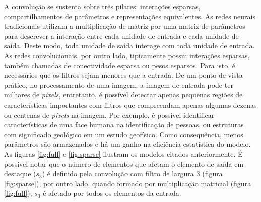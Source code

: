 A convolução se sustenta sobre três pilares: interações esparsas, compartilhamentos
de parâmetros e representações equivalentes. As redes neurais tradicionais
utilizam a multiplicação de matriz por uma matriz de parâmetros para descrever
a interação entre cada unidade de entrada e cada unidade de saída. Deste modo,
toda unidade de saída interage com toda unidade de entrada.
As redes convolucionais, por outro lado, tipicamente possui interações
esparsas, também chamadas de conectividade esparsa ou pesos esparsos.
Para isto, é necessários que os filtros sejam menores que a entrada.
De um ponto de vista prático, no processamento de uma imagem,
a imagem de entrada pode ter milhares de \textit{pixels}, entretanto, é 
possível detectar apenas pequenas regiões de características importantes
com filtros que compreendam apenas algumas dezenas ou centenas de \textit{pixels} na imagem.
Por exemplo, é possível identificar características de uma face humana na identificação de pessoas, ou estruturas com
significado geológico em um estudo geofísico. Como consequência,
menos parâmetros são armazenados e há um ganho na eficiência estatística do
modelo. As figuras \ref{fig:full} e \ref{fig:sparse} ilustram
os modelos citados anteriormente. É possível notar que o número de elementos
que afetam o elemento de saída em destaque ($s_3$) é definido pela convolução
com filtro de largura 3 (figura \ref{fig:sparse}), por outro lado, quando formado por multiplicação
matricial (figura \ref{fig:full}), $s_3$ é
afetado por todos os elementos da entrada.

